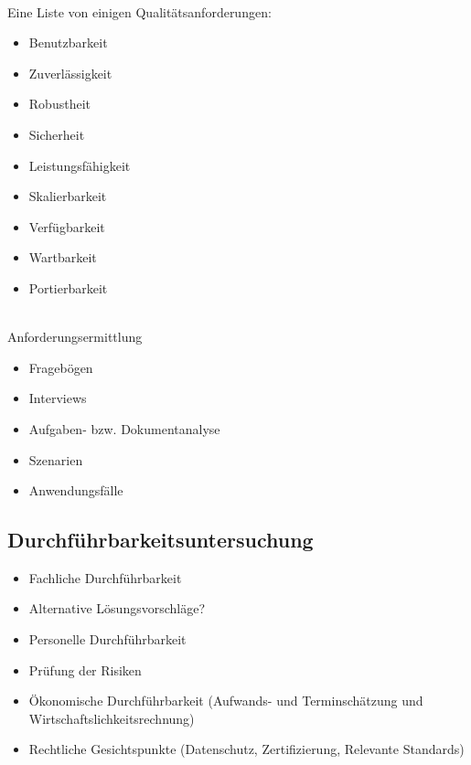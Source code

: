 \newpage

\\
Eine Liste von einigen Qualitätsanforderungen:
\begin{itemize}
    \item Benutzbarkeit
    \item Zuverlässigkeit
    \item Robustheit
    \item Sicherheit
    \item Leistungsfähigkeit
    \item Skalierbarkeit
    \item Verfügbarkeit
    \item Wartbarkeit
    \item Portierbarkeit
\end{itemize}

\\
Anforderungsermittlung
\begin{itemize}
    \item Fragebögen
    \item Interviews
    \item Aufgaben- bzw. Dokumentanalyse
    \item Szenarien
    \item Anwendungsfälle
\end{itemize}



\subsection{Durchführbarkeitsuntersuchung}
\begin{itemize}
    \item Fachliche Durchführbarkeit
    \item Alternative Lösungsvorschläge?
    \item Personelle Durchführbarkeit
    \item Prüfung der Risiken
    \item Ökonomische Durchführbarkeit (Aufwands- und Terminschätzung und Wirtschaftslichkeitsrechnung)
    \item Rechtliche Gesichtspunkte (Datenschutz, Zertifizierung, Relevante Standards)
\end{itemize}
